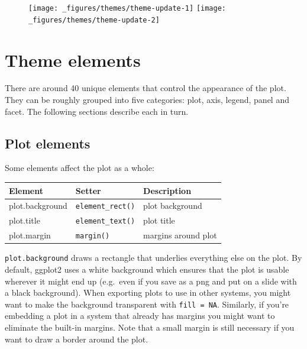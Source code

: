 \begin{figure}[H]
  \centering
  \texttt{[image: \_figures/themes/theme-update-1]}%
  \texttt{[image: \_figures/themes/theme-update-2]}
\end{figure}

\section{Theme elements}\label{sec:theme-elements}

There are around 40 unique elements that control the appearance of the
plot. They can be roughly grouped into five categories: plot, axis,
legend, panel and facet. The following sections describe each in turn.

\subsection{Plot elements}\label{plot-elements}


Some elements affect the plot as a whole:

\begin{longtable}[c]{@{}lll@{}}
\toprule
Element & Setter & Description\tabularnewline
\midrule
\endhead
plot.background & \texttt{element\_rect()} & plot
background\tabularnewline
plot.title & \texttt{element\_text()} & plot title\tabularnewline
plot.margin & \texttt{margin()} & margins around plot\tabularnewline
\bottomrule
\end{longtable}

\texttt{plot.background} draws a rectangle that underlies everything
else on the plot. By default, ggplot2 uses a white background which
ensures that the plot is usable wherever it might end up (e.g.~even if
you save as a png and put on a slide with a black background). When
exporting plots to use in other systems, you might want to make the
background transparent with \texttt{fill\ =\ NA}. Similarly, if you're
embedding a plot in a system that already has margins you might want to
eliminate the built-in margins. Note that a small margin is still
necessary if you want to draw a border around the plot.

